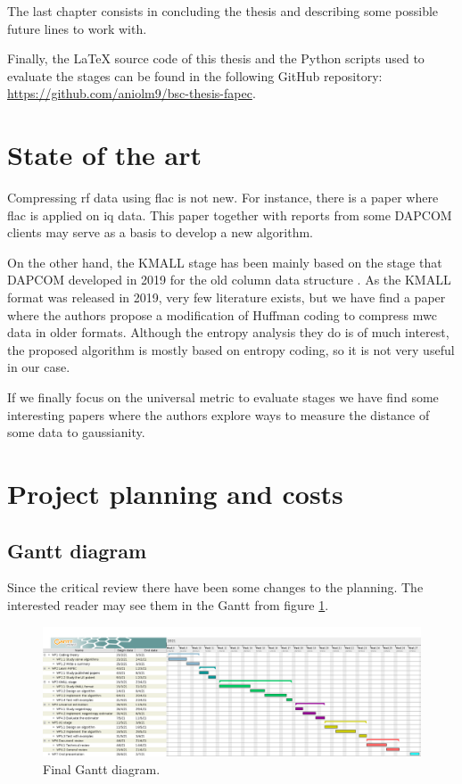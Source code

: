 The last chapter consists in concluding the thesis and describing some possible future lines to work with.

Finally, the LaTeX source code of this thesis and the Python scripts used to evaluate the stages can be found in the following GitHub repository: \url{https://github.com/aniolm9/bsc-thesis-fapec}.

\section{State of the art}
Compressing \acrshort{rf} data using \acrshort{flac} is not new. For instance, there is a paper \parencite{IQFlac} where \acrshort{flac} is applied on \acrshort{iq} data. This paper together with reports from some DAPCOM clients may serve as a basis to develop a new algorithm.

On the other hand, the KMALL stage has been mainly based on the stage that DAPCOM developed in 2019 for the old column data structure \parencite{Portell2019}. As the KMALL format was released in 2019, very few literature exists, but we have find a paper \parencite{MBESComp} where the authors propose a modification of Huffman coding to compress \acrshort{mwc} data in older formats. Although the entropy analysis they do is of much interest, the proposed algorithm is mostly based on entropy coding, so it is not very useful in our case.

If we finally focus on the universal metric to evaluate stages we have find some interesting papers \parencite{negentropy} \parencite{HYVARINEN2000411} where the authors explore ways to measure the distance of some data to gaussianity.

\section{Project planning and costs}
\subsection{Gantt diagram}
Since the critical review there have been some changes to the planning. The interested reader may see them in the Gantt from figure \ref{fig:gantt}.
\begin{figure}[h!]
	\begin{center}
		\includegraphics[scale=0.255]{images/gantt.png}
	\end{center}
	\caption{Final Gantt diagram.}
	\label{fig:gantt}
\end{figure}

